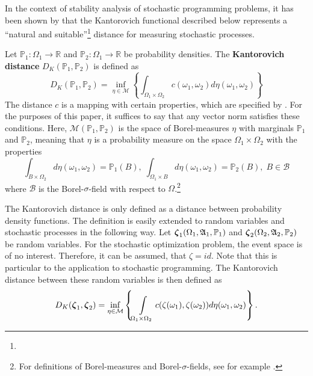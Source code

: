 In the context of stability analysis of stochastic programming problems, it has been shown by  that the Kantorovich functional described below
represents a  ``natural and suitable''\footnote{} distance for measuring stochastic processes.
\begin{definition}
  Let $\mathbb{P}_1:\Omega_1\rightarrow\mathbb{R}$ and $\mathbb{P}_2:\Omega_1\rightarrow\mathbb{R}$ be probability densities.
  The \textbf{Kantorovich distance} $D_K(\mathbb{P}_1,\mathbb{P}_2)$ is defined as
  \begin{equation}
    \label{eq:define-infinitedim-kantorovich}
    D_K(\mathbb{P}_1, \mathbb{P}_2) = \inf\limits_{\eta\in\mathcal{M}}\left\{\int_{\Omega_1\times\Omega_2}c(\omega_1, \omega_2)d\eta(\omega_1,\omega_2)\right\}
  \end{equation}
  The distance $c$ is a mapping with certain properties, which are specified by .
  For the purposes of this paper, it suffices to say that any vector norm satisfies these conditions.
Here, $\mathcal{M}(\mathbb{P}_1, \mathbb{P}_2)$ is the space of Borel-measures $\eta$ with marginals $\mathbb{P}_1$ and $\mathbb{P}_2$, meaning that $\eta$ is a probability measure on the space $\Omega_1\times\Omega_2$ with the properties
\begin{equation}
  \label{eq:define-borel-measures}
  \int_{B\times \Omega_2} d\eta(\omega_1,\omega_2) = \mathbb{P}_1(B),\;   \int_{\Omega_1\times B} d\eta(\omega_1,\omega_2) = \mathbb{P}_2(B),\; B \in \mathcal{B}
\end{equation}
where $\mathcal{B}$ is the Borel-$\sigma$-field with respect to $\Omega$.\footnote{For definitions of Borel-measures and Borel-$\sigma$-fields, see for example .}
\end{definition}
The Kantorovich distance is only defined as a distance between probability density functions.
The definition is easily extended to random variables and stochastic processes in the following way.
Let $\boldsymbol\zeta_1(\Omega_1,\mathfrak{A}_1,\mathbb{P}_1)$ and $\boldsymbol\zeta_2(\Omega_2,\mathfrak{A}_2,\mathbb{P}_2)$ be random variables.
For the stochastic optimization problem, the event space is of no interest.
Therefore, it can be assumed, that $\zeta = id$.
Note that this is particular to the application to stochastic programming.
The Kantorovich distance between these random variables is then defined as
\begin{equation}
  \label{eq:64}
  D_K(\boldsymbol\zeta_1,\boldsymbol\zeta_2) = \inf\limits_{\eta\in\mathcal{M}}\left\{\int\limits_{\Omega_1\times\Omega_2}c(\zeta(\omega_1),\zeta(\omega_2))d\eta(\omega_1,\omega_2)\right\}.
\end{equation}
